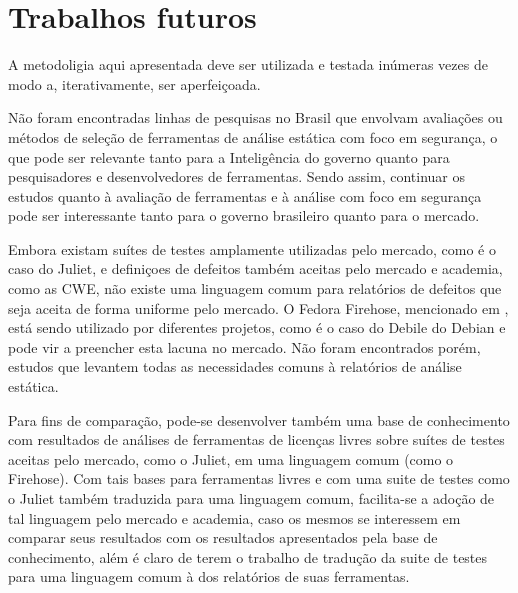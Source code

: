 \section{Trabalhos futuros}

A metodoligia aqui apresentada deve ser utilizada e testada inúmeras vezes de modo a, iterativamente, ser aperfeiçoada.

Não foram encontradas linhas de pesquisas no Brasil que envolvam avaliações ou métodos de seleção de ferramentas de análise estática com foco em segurança, o que pode ser relevante tanto para a Inteligência do governo quanto para pesquisadores e desenvolvedores de ferramentas. Sendo assim, continuar os estudos quanto à avaliação de ferramentas e à análise com foco em segurança pode ser interessante tanto para o governo brasileiro quanto para o mercado.

Embora existam suítes de testes amplamente utilizadas pelo mercado, como é o caso do Juliet, e definiçoes de defeitos também aceitas pelo mercado e academia, como as CWE, não existe uma linguagem comum para relatórios de defeitos que seja aceita de forma uniforme pelo mercado. O Fedora Firehose, mencionado em , está sendo utilizado por diferentes projetos, como é o caso do Debile do Debian e pode vir a preencher esta lacuna no mercado. Não foram encontrados porém, estudos que levantem todas as necessidades comuns à relatórios de análise estática.

Para fins de comparação, pode-se desenvolver também uma base de conhecimento com resultados de análises de  ferramentas de licenças livres sobre suítes de testes aceitas pelo mercado, como o Juliet, em uma linguagem comum (como o Firehose). Com tais bases para ferramentas livres e com uma suite de testes como o Juliet também traduzida para uma linguagem comum, facilita-se a adoção de tal linguagem pelo mercado e academia, caso os mesmos se interessem em comparar seus resultados com os resultados apresentados pela base de conhecimento, além é claro de terem o trabalho de tradução da suite de testes para uma linguagem comum à dos relatórios de suas ferramentas.

